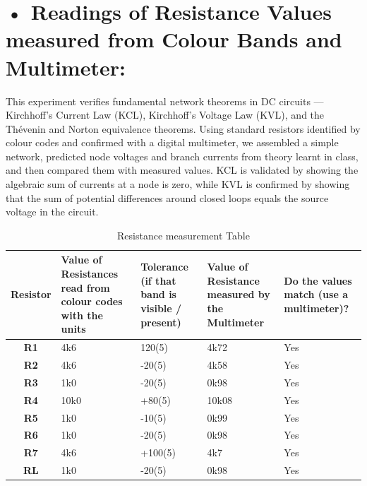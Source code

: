 \documentclass{article}
\begin{document}
	\section*{• Readings of Resistance Values measured from Colour Bands and Multimeter:}
	
	\vspace{5mm}
	
	This experiment verifies fundamental network theorems in DC circuits — Kirchhoff’s Current Law (KCL), Kirchhoff’s Voltage Law (KVL), and the Thévenin and Norton equivalence theorems. Using standard resistors identified by colour codes and confirmed with a digital multimeter, we assembled a simple network, predicted node voltages and branch currents from theory learnt in class, and then compared them with measured values. KCL is validated by showing the algebraic sum of currents at a node is zero, while KVL is confirmed by showing that the sum of potential differences around closed loops equals the source voltage in the circuit.
    
    \vspace{1cm}
	
	\begin{table}[h!]
		\centering
		\small
		\begin{tabularx}{\textwidth}{|c|X|X|X|X|}
			\hline
			\textbf{Resistor} & \textbf{Value of Resistances read from colour codes with the units} & \textbf{Tolerance (if that band is visible / present)} & \textbf{Value of Resistance measured by the Multimeter} & \textbf{Do the values match (use a multimeter)?} \\
			\hline
			\textbf{R1} &4k6 & 120(5)& 4k72& Yes\\
			\hline
			\textbf{R2} &4k6 & -20(5)& 4k58& Yes\\
			\hline
			\textbf{R3} & 1k0& -20(5)& 0k98& Yes\\
			\hline
			\textbf{R4} & 10k0 & +80(5) &10k08 & Yes\\
			\hline
			\textbf{R5} &1k0 & -10(5)& 0k99& Yes\\
			\hline
			\textbf{R6} &1k0 & -20(5)& 0k98& Yes\\
			\hline
			\textbf{R7} &4k6 & +100(5)& 4k7& Yes\\
			\hline
			\textbf{RL} &1k0 & -20(5)& 0k98& Yes\\
			\hline
		\end{tabularx}
		\caption{Resistance measurement Table}
		
	
	\end{table}
\end{document}
